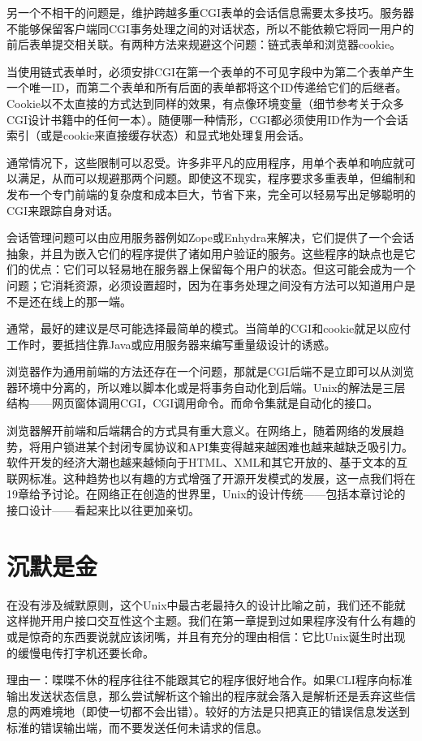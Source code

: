 \documentclass[12pt,oneside]{ctexbook}
\begin{document}
\begin{common-format}
另一个不相干的问题是，维护跨越多重CGI表单的会话信息需要太多技巧。服务器不能够保留客户端同CGI事务处理之间的对话状态，所以不能依赖它将同一用户的前后表单提交相关联。有两种方法来规避这个问题：链式表单和浏览器cookie。

当使用链式表单时，必须安排CGI在第一个表单的不可见字段中为第二个表单产生一个唯一ID，而第二个表单和所有后面的表单都将这个ID传递给它们的后继者。Cookie以不太直接的方式达到同样的效果，有点像环境变量（细节参考关于众多CGI设计书籍中的任何一本）。随便哪一种情形，CGI都必须使用ID作为一个会话索引（或是cookie来直接缓存状态）和显式地处理复用会话。

通常情况下，这些限制可以忍受。许多非平凡的应用程序，用单个表单和响应就可以满足，从而可以规避那两个问题。即使这不现实，程序要求多重表单，但编制和发布一个专门前端的复杂度和成本巨大，节省下来，完全可以轻易写出足够聪明的CGI来跟踪自身对话。

会话管理问题可以由应用服务器例如Zope或Enhydra来解决，它们提供了一个会话抽象，并且为嵌入它们的程序提供了诸如用户验证的服务。这些程序的缺点也是它们的优点：它们可以轻易地在服务器上保留每个用户的状态。但这可能会成为一个问题；它消耗资源，必须设置超时，因为在事务处理之间没有方法可以知道用户是不是还在线上的那一端。

通常，最好的建议是尽可能选择最简单的模式。当简单的CGI和cookie就足以应付工作时，要抵挡住靠Java或应用服务器来编写重量级设计的诱惑。

浏览器作为通用前端的方法还存在一个问题，那就是CGI后端不是立即可以从浏览器环境中分离的，所以难以脚本化或是将事务自动化到后端。Unix的解法是三层结构——网页窗体调用CGI，CGI调用命令。而命令集就是自动化的接口。

浏览器解开前端和后端耦合的方式具有重大意义。在网络上，随着网络的发展趋势，将用户锁进某个封闭专属协议和API集变得越来越困难也越来越缺乏吸引力。软件开发的经济大潮也越来越倾向于HTML、XML和其它开放的、基于文本的互联网标准。这种趋势也以有趣的方式增强了开源开发模式的发展，这一点我们将在19章给予讨论。在网络正在创造的世界里，Unix的设计传统——包括本章讨论的接口设计——看起来比以往更加亲切。

\section{沉默是金}
在没有涉及缄默原则，这个Unix中最古老最持久的设计比喻之前，我们还不能就这样抛开用户接口交互性这个主题。我们在第一章提到过如果程序没有什么有趣的或是惊奇的东西要说就应该闭嘴，并且有充分的理由相信：它比Unix诞生时出现的缓慢电传打字机还要长命。

理由一：喋喋不休的程序往往不能跟其它的程序很好地合作。如果CLI程序向标准输出发送状态信息，那么尝试解析这个输出的程序就会落入是解析还是丢弃这些信息的两难境地（即使一切都不会出错）。较好的方法是只把真正的错误信息发送到标淮的错误输出端，而不要发送任何未请求的信息。


\end{common-format}
\end{document}
